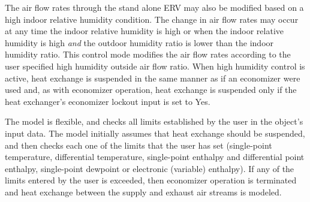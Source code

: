 The air flow rates through the stand alone ERV may also be modified based on a high indoor relative humidity condition. The change in air flow rates may occur at any time the indoor relative humidity is high or when the indoor relative humidity is high \emph{and} the outdoor humidity ratio is lower than the indoor humidity ratio. This control mode modifies the air flow rates according to the user specified high humidity outside air flow ratio. When high humidity control is active, heat exchange is suspended in the same manner as if an economizer were used and, as with economizer operation, heat exchange is suspended only if the heat exchanger's economizer lockout input is set to Yes.

The model is flexible, and checks all limits established by the user in the object's input data. The model initially assumes that heat exchange should be suspended, and then checks each one of the limits that the user has set (single-point temperature, differential temperature, single-point enthalpy and differential point enthalpy, single-point dewpoint or electronic (variable) enthalpy). If any of the limits entered by the user is exceeded, then economizer operation is terminated and heat exchange between the supply and exhaust air streams is modeled.
